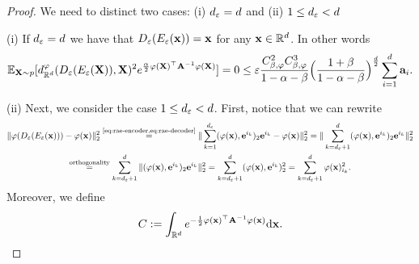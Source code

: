 \begin{proof}
    We need to distinct two cases: (i) $d_\varepsilon = d$ and (ii) $1 \leq d_\varepsilon < d$

    (i) If $d_\varepsilon = d$ we have that $D_\varepsilon(E_\varepsilon(\mathbf{x})) = \mathbf{x}$ for any $\mathbf{x}\in \mathbb{R}^d$. In other words
    \begin{equation}
        \mathbb{E}_{\mathbf{X} \sim p}[d_{\mathbb{R}^{d}}^\varphi (D_\varepsilon(E_\varepsilon(\mathbf{X})), \mathbf{X})^2 e^{\frac{\alpha}{2} \varphi(\mathbf{X})^\top \mathbf{A}^{-1} \varphi(\mathbf{X})}] = 0 \leq \varepsilon \frac{C^2_{\beta,\varphi} C^3_{\beta,\varphi}}{1 - \alpha - \beta} \Bigl(\frac{1 + \beta}{1 - \alpha - \beta} \Bigr)^{\frac{d}{2}} \sum_{i=1}^{d} \mathbf{a}_{i}.
    \end{equation}

    (ii) Next, we consider the case $1 \leq d_\varepsilon < d$.
    First, notice that we can rewrite 
    \begin{multline}
        \| \varphi(D_\varepsilon(E_\varepsilon(\mathbf{x}))) - \varphi(\mathbf{x}) \|_2^2 \overset{\text{\ref{eq:rae-encoder,eq:rae-decoder}}}{=} \|\sum_{k=1}^{d_\varepsilon} (\varphi(\mathbf{x}), \mathbf{e}^{i_k})_2 \mathbf{e}^{i_k} - \varphi(\mathbf{x})\|_2^2 = \|\sum_{k=d_\varepsilon+1}^{d} (\varphi(\mathbf{x}), \mathbf{e}^{i_k})_2 \mathbf{e}^{i_k}\|_2^2 \\
        \overset{\text{orthogonality}}{=} \sum_{k=d_\varepsilon+1}^{d} \|(\varphi(\mathbf{x}), \mathbf{e}^{i_k})_2 \mathbf{e}^{i_k}\|_2^2 = \sum_{k=d_\varepsilon+1}^{d}(\varphi(\mathbf{x}), \mathbf{e}^{i_k})_2^2 = \sum_{k=d_\varepsilon+1}^{d}\varphi(\mathbf{x})_{i_k}^2.
        \label{eq:rewrite-RAEx-x}
    \end{multline}
    Moreover, we define
    \begin{equation}
        C :=  \int_{\mathbb{R}^{d}} e^{-\frac{1}{2} \varphi(\mathbf{x})^\top \mathbf{A}^{-1} \varphi(\mathbf{x})} \mathrm{d} \mathbf{x}.
        \label{eq:RAEnormalizationConstant}
    \end{equation}
    

\end{proof}

